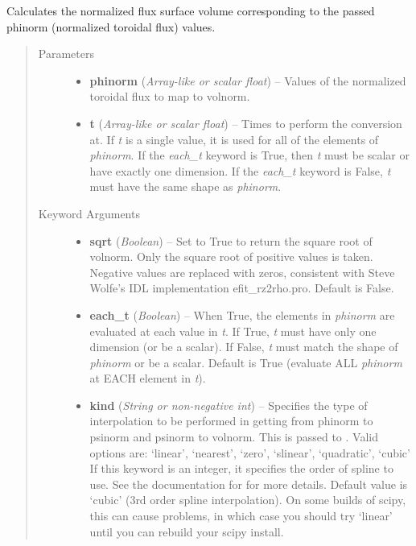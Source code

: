 \documentclass[letterpaper,10pt,english]{sphinxmanual}
\begin{document}
\begin{fulllineitems}
\begin{fulllineitems}
\end{fulllineitems}


\begin{fulllineitems}
\label{eqtools:eqtools.core.Equilibrium.phinorm2volnorm}
Calculates the normalized flux surface volume corresponding to the passed phinorm (normalized toroidal flux) values.
\begin{quote}\begin{description}
\item[{Parameters}] \leavevmode\begin{itemize}
\item {} 
\textbf{phinorm} (\emph{Array-like or scalar float}) --
Values of the normalized
toroidal flux to map to volnorm.

\item {} 
\textbf{t} (\emph{Array-like or scalar float}) --
Times to perform the conversion at.
If \emph{t} is a single value, it is used for all of the elements of
\emph{phinorm}. If the \emph{each\_t} keyword is True, then \emph{t} must be scalar
or have exactly one dimension. If the \emph{each\_t} keyword is False,
\emph{t} must have the same shape as \emph{phinorm}.

\end{itemize}

\item[{Keyword Arguments}] \leavevmode\begin{itemize}
\item {} 
\textbf{sqrt} (\emph{Boolean}) --
Set to True to return the square root of volnorm.
Only the square root of positive values is taken. Negative
values are replaced with zeros, consistent with Steve Wolfe's
IDL implementation efit\_rz2rho.pro. Default is False.

\item {} 
\textbf{each\_t} (\emph{Boolean}) --
When True, the elements in \emph{phinorm} are evaluated
at each value in \emph{t}. If True, \emph{t} must have only one dimension
(or be a scalar). If False, \emph{t} must match the shape of \emph{phinorm}
or be a scalar. Default is True (evaluate ALL \emph{phinorm} at EACH
element in \emph{t}).

\item {} 
\textbf{kind} (\emph{String or non-negative int}) --
Specifies the type of
interpolation to be performed in getting from phinorm to
psinorm and psinorm to volnorm. This is passed to
. Valid options are:
`linear', `nearest', `zero', `slinear', `quadratic', `cubic'
If this keyword is an integer, it specifies the order of spline
to use. See the documentation for  for more
details. Default value is `cubic' (3rd order spline
interpolation). On some builds of scipy, this can cause problems,
in which case you should try `linear' until you can rebuild your
scipy install.


\end{itemize}
\end{description}
\end{quote}
\end{fulllineitems}
\end{fulllineitems}
\end{document}
